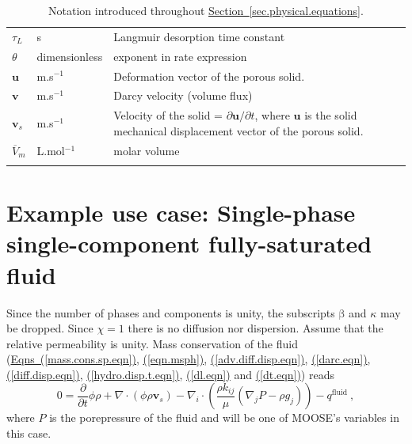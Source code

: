 \documentclass[12pt]{report}
\def\species{\kappa}
\def\phase{\mathrm{\beta}}
\def\massfrac{\chi}
\def\darcyvel{\mathbf{v}}
\begin{document}
\begin{longtable}{llp{10cm}}
$\tau_{L}$ & s & Langmuir desorption time constant \\

$\theta$ & dimensionless & exponent in rate expression \\

${\mathbf{u}}$ & m.s$^{-1}$ & Deformation vector of the porous solid. \\

$\darcyvel$ & m.s$^{-1}$ & Darcy velocity (volume flux) \\

${\mathbf v}_{s}$ & m.s$^{-1}$ & Velocity of the solid = $\partial
{\mathbf u}/\partial t$, where ${\mathbf u}$ is the solid mechanical
displacement vector of the porous solid. \\

$\overline{V}_{m}$ & L.mol$^{-1}$ & molar volume \\
\hline
\caption{Notation introduced throughout
  \hyperref[sec.physical.equations]{Section~\ref*{sec.physical.equations}}.}
\label{table.notation}
\end{longtable}


\section{Example use case: Single-phase single-component fully-saturated fluid}

Since the number of phases and components is unity, the subscripts
$\phase$ and $\species$ may be dropped.  Since $\massfrac=1$ there is
no diffusion nor dispersion.  Assume that the relative permeability is
unity.  Mass conservation of the fluid
(\hyperref[mass.cons.sp.eqn]{Eqns~(\ref*{mass.cons.sp.eqn})},
\hyperref[eqn.msph]{(\ref*{eqn.msph})},
\hyperref[adv.diff.disp.eqn]{(\ref*{adv.diff.disp.eqn})},
\hyperref[darc.eqn]{(\ref*{darc.eqn})},
\hyperref[diff.disp.eqn]{(\ref*{diff.disp.eqn})},
\hyperref[hydro.disp.t.eqn]{(\ref*{hydro.disp.t.eqn})},
\hyperref[dl.eqn]{(\ref*{dl.eqn})} and
\hyperref[dt.eqn]{(\ref*{dt.eqn})}) reads
\begin{equation}
0 = \frac{\partial}{\partial t}\phi\rho +
\nabla\cdot(\phi\rho{\mathbf{v}_{s}}) - \nabla_{i}\cdot\left(\frac{\rho
  k_{ij}}{\mu}(\nabla_{j} P - \rho g_{j}) \right) - q^{\mathrm{fluid}}
\ ,
\label{1phase.flow.eqn}
\end{equation}
where $P$ is the porepressure of the fluid and will be one of MOOSE's
variables in this case.
\end{document}

